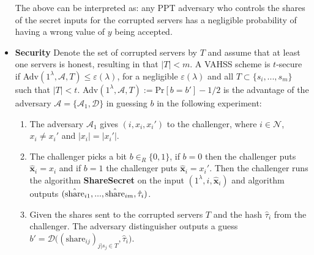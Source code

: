 \begin{itemize}
The above can be interpreted as: any PPT adversary who controls the shares of the  secret inputs for the corrupted servers has a negligible probability of having a wrong value of $y$ being accepted.

\item \textbf{Security} Denote the set of corrupted servers by $T$ and assume that at least one servers is honest, resulting in that $|T|<m$. A VAHSS scheme is $t$-secure if  Adv$(1^\lambda,\mathcal{A},T)\leq \varepsilon (\lambda)$, for a negligible $\varepsilon(\lambda)$  and all $T\subset \{s_i,...,s_m\}$ such that $|T|< t$. Adv$(1^\lambda,\mathcal{A},T):= \text{Pr}[b=b']-1/2$ is the advantage of the adversary $\mathcal{A} = \{\mathcal{A}_1,\mathcal{D}\}$ in guessing $b$ in the following experiment:
\begin{enumerate}
\item The adversary $\mathcal{A}_1$ gives $(i,x_i,x_i')$ to the challenger, where  $i\in\mathcal{N}$, $x_i\neq x_i'$ and $|x_i|=|x_i'|$.
\item The challenger picks a bit $b\in_R\{0,1\}$, if $b=0$ then the challenger puts $\mathbf{\hat{x}}_i =x_i$ and if $b=1$ the challenger puts  $\mathbf{\hat{x}}_i =x_i'$. Then the challenger runs the algorithm \textbf{ShareSecret} on the input $(1^\lambda,i,\mathbf{\hat{x}}_i)$ and algorithm outputs $( \Hat {\text{share}}_{i1},...,\hat{\text{share}}_{im},\hat{\tau}_i) $.

\item Given the shares sent to the corrupted servers $T$ and the hash $\hat{\tau}_i$ from the challenger.  The adversary distinguisher outputs a guess $b'= \mathcal{D}\big( ({\text{share}}_{ij})_{j| s_j\in T} , \hat{\tau}_i \big)$.
\end{enumerate}

\end{itemize}




